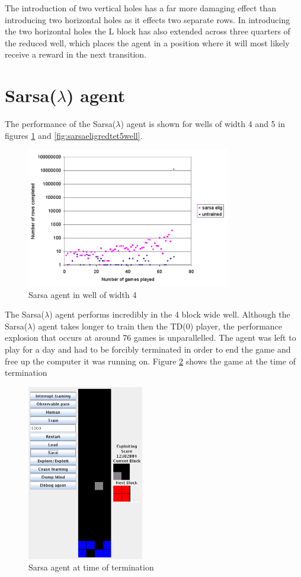 \documentclass{rucsthesis}
\begin{document}
The introduction of two vertical holes has a far more damaging effect than introducing two horizontal holes as it effects two separate rows. In introducing the two horizontal holes the L block has also extended across three quarters of the reduced well, which places the agent in a position where it will most likely receive a reward in the next transition.

\section{Sarsa($\lambda$) agent}

The performance of the Sarsa($\lambda$) agent is shown for wells of width 4 and 5 in figures \ref{fig:sarsaeligredtet4well} and \ref{fig:sarsaeligredtet5well}.

\begin{figure}[h]
\centering
\includegraphics[width=3.5in]{sarsaeligredtet4well.png}
\caption{Sarsa agent in well of width 4}
\label{fig:sarsaeligredtet4well}
\end{figure}

The Sarsa($\lambda$) agent performs incredibly in the 4 block wide well. Although the Sarsa($\lambda$) agent takes longer to train then the TD(0) player, the performance explosion that occurs at around 76 games is unparallelled. The agent was left to play for a day and had to be forcibly terminated in order to end the game and free up the computer it was running on. Figure \ref{fig:sarsaelig4term} shows the game at the time of termination 

\begin{figure}[h]
\centering
\includegraphics[width=2in]{sarsaelig4term.png}
\caption{Sarsa agent at time of termination}
\label{fig:sarsaelig4term}
\end{figure}
\end{document}
